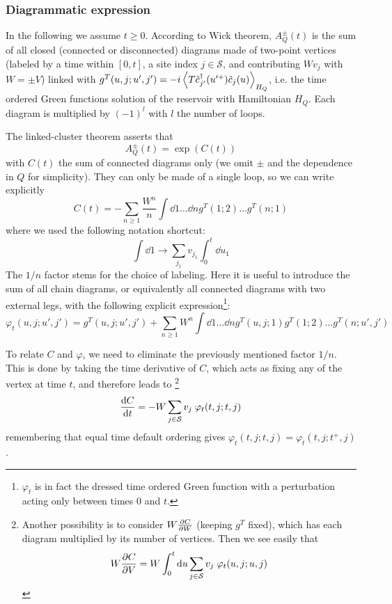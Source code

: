 \documentclass[12pt]{article}
\begin{document}
\subsubsection{Diagrammatic expression}

In the following we assume $t \ge 0$.
According to Wick theorem, $A^{\pm}_Q(t)$ is the sum of all closed (connected or disconnected) diagrams made of two-point vertices (labeled by a time within $[0, t]$, a site index $j \in \mathcal{S}$, and contributing $W v_j$ with $W=\pm V$) linked with $g^T(u, j; u', j') = -i\expval{T \tilde c_{j'}^\dag(u'^+) \tilde c_j(u)}_{H_Q}$, i.e. the time ordered Green functions solution of the reservoir with Hamiltonian $H_Q$. Each diagram is multiplied by $(-1)^{l}$ with $l$ the number of loops.

The linked-cluster theorem asserts that
\begin{equation}
	A^{\pm}_Q(t) = \exp(C(t))
\end{equation}
with $C(t)$ the sum of connected diagrams only (we omit $\pm$ and the dependence in $Q$ for simplicity). They can only be made of a single loop, so we can write explicitly
\begin{equation}
	C(t) = - \sum_{n \ge 1} \frac{W^n}{n} \int \dd{1} \ldots \dd{n} g^T(1; 2) \ldots g^T(n; 1)
\end{equation}
where we used the following notation shortcut:
\begin{equation}
	\int \dd{1} \rightarrow \sum_{j_1} v_{j_1} \int_0^t \dd{u_1}
\end{equation}
The $1/n$ factor stems for the choice of labeling.
Here it is useful to introduce the sum of all chain diagrams, or equivalently all connected diagrams with two external legs, with the following explicit expression\footnote{$\varphi_t$ is in fact the dressed time ordered Green function with a perturbation acting only between times $0$ and $t$.}:
\begin{equation}
	\varphi_t(u, j; u', j') = g^T(u, j; u', j') + \sum_{n \ge 1} W^n \int \dd{1} \ldots \dd{n} g^T(u, j; 1) g^T(1; 2) \ldots g^T(n; u', j')
\end{equation}

To relate $C$ and $\varphi$, we need to eliminate the previously mentioned factor $1/n$. 
This is done by taking the time derivative of $C$, which acts as fixing any of the vertex at time $t$, and therefore leads to%
\footnote{
Another possibility is to consider $W \pdv{C}{W}$ (keeping $g^T$ fixed), which has each diagram multiplied by its number of vertices. Then we see easily that
\begin{equation}
	W \pdv{C}{V} = W \int_0^t \dd{u} \sum_{j \in \mathcal{S}} v_j \; \varphi_t(u, j; u, j)
\end{equation}
}
\begin{equation}
	\dv{C}{t} = -W \sum_{j \in \mathcal{S}} v_j \; \varphi_t(t, j; t, j)
\end{equation}
remembering that equal time default ordering gives $\varphi_t(t, j; t, j) = \varphi_t(t, j; t^+, j)$.
\end{document}
